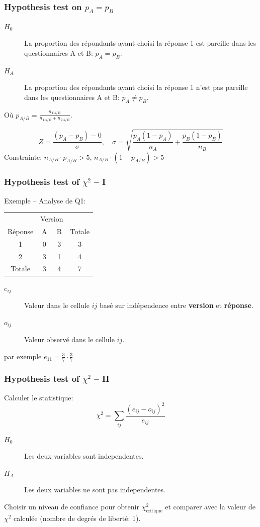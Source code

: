 \documentclass{beamer}
\begin{document}
\begin{frame}
  \frametitle{Hypothesis test on $p_A = p_B $}
  \begin{description}
  \item[$H_0$] La proportion des répondants ayant choisi la réponse 1 est
                pareille dans les questionnaires A et B: $p_A = p_B$. 
  \item[$H_A$] La proportion des répondants ayant choisi la réponse
                1 n’est pas  pareille dans les questionnaires A et B: $p_A \ne p_B$.
  \end{description}
  Où $p_{A/B}  = \frac{n_{1A/B}}{n_{1A/B}  + n_{2A/B}}$.

  \[
  Z = \frac{(p_A-p_B) - 0}{\sigma} ,\quad
  \sigma = \sqrt{\frac{p_A(1-p_A)}{n_A} + \frac{p_B(1-p_B)}{n_B}} 
  \]
  Constrainte: $n_{A/B} \cdot p_{A/B} > 5$, $n_{A/B} \cdot (1-p_{A/B}) > 5$ 
\end{frame}

\begin{frame}
  \frametitle{Hypothesis test of $\chi^2$ -- I}
Exemple -- Analyse de Q1:


\begin{center}
\begin{tabular}{c|cc|c}
   & \multicolumn{2}{c|}{Version} &  \\ 
  Réponse  & A & B & Totale \\ \hline
  1 & 0 & 3 & 3 \\
  2 & 3 & 1 & 4 \\ \hline
  Totale & 3 & 4 & 7
\end{tabular}
\end{center}

\begin{description}
\item [$e_{ij}$] Valeur dans le cellule ${ij}$ basé sur indépendence entre
  {\bf version} et {\bf réponse}.
\item [$o_{ij}$] Valeur observé dans le cellule ${ij}$.
\end{description}

par exemple $e_{11} = \frac{3}{7} \cdot \frac{3}{7}$
\end{frame}

\begin{frame}
\frametitle{Hypothesis test of $\chi^2$ -- II}

Calculer le statistique:
\[
\chi^2 = \sum_{ij} \frac{(e_{ij}-o_{ij})^2}{e_{ij}}
\]

  \begin{description}
  \item[$H_0$] Les deux variables sont independentes. 
  \item[$H_A$] Les deux variables ne sont pas independentes.
  \end{description}

  Choisir un niveau de confiance pour obtenir $\chi^2_{\text{critique}}$ et comparer avec
  la valeur de $\chi^2$ calculée (nombre de degrés de liberté: 1). 
\end{frame}
\end{document}
